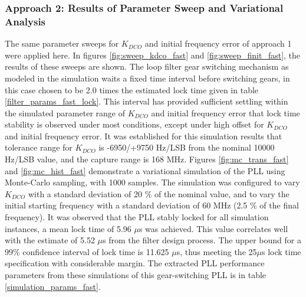 		\subsubsection{Approach 2: Results of Parameter Sweep and Variational Analysis}
		The same parameter sweeps for $K_{DCO}$ and initial frequency error of approach 1 were applied here. In figures \ref{fig:sweep_kdco_fast} and \ref{fig:sweep_finit_fast}, the results of these sweeps are shown. The loop filter gear switching mechanism as modeled in the simulation waits a fixed time interval before switching gears, in this case chosen to be 2.0 times the estimated lock time given in table \ref{filter_params_fast_lock}. This interval has provided sufficient settling within the simulated parameter range of $K_{DCO}$ and initial frequency error that lock time stability is observed under most conditions, except under high offset for $K_{DCO}$ and initial frequency error. It was established for this simulation results that tolerance range for $K_{DCO}$ is -6950/+9750 Hz/LSB from the nominal 10000 Hz/LSB value, and the capture range is 168 MHz. Figures \ref{fig:mc_trans_fast} and \ref{fig:mc_hist_fast} demonstrate a variational simulation of the PLL using Monte-Carlo sampling, with 1000 samples. The simulation was configured to vary $K_{DCO}$ with a standard deviation of 20 \% of the nominal value, and to vary the initial starting frequency with a standard deviation of 60 MHz (2.5 \% of the final frequency). It was observed that the PLL stably locked for all simulation instances, a mean lock time of 5.96 $\mu$s was achieved. This value correlates well with the estimate of 5.52 $\mu$s from the filter design process. The upper bound for a 99\% confidence interval of lock time is 11.625 $\mu$s, thus meeting the 25$\mu$s lock time specification with considerable margin. The extracted PLL performance parameters from these simulations of this gear-switching PLL is in table \ref{simulation_params_fast}. 

